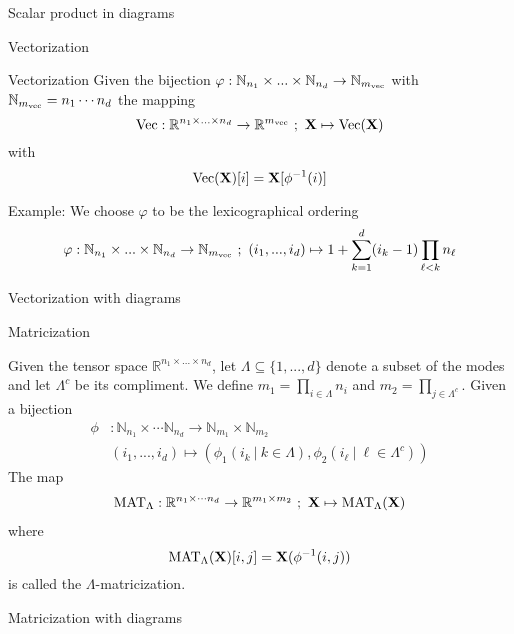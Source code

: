 \documentclass{beamer}
\newcommand{\bvec}[1]{\mathbf{#1}}
\newcommand{\vX}{\bvec{X}}
\begin{document}
\begin{frame}{Scalar product in diagrams}
    
\end{frame}


\begin{frame}{Vectorization}

\begin{definition}{Vectorization}
Given the bijection $\varphi : \mathbb{N}_{n_1} \times ... \times  \mathbb{N}_{n_d} \to  \mathbb{N}_{m_{\rm vec}}$ with $\mathbb{N}_{m_{\rm vec}} = n_1\cdots n_d$ the mapping 
$$
{\rm Vec} :  \mathbb{R}^{{n_1} \times ... \times  {n_d}} \to \mathbb{R}^{m_{\rm vec}}
~;~
\vX \mapsto {\rm Vec}(\vX)
$$
with 
$$
{\rm Vec}(\vX)[i]
=
\vX[\phi^{-1}(i)]
$$
\end{definition}

Example: We choose $\varphi$ to be the lexicographical ordering
$$
\varphi
:
\mathbb{N}_{n_1} \times ... \times  \mathbb{N}_{n_d} \to  \mathbb{N}_{m_{\rm vec}}
~;~
(i_1,...,i_d)
\mapsto
1 + \sum_{k=1}^d (i_k -1 ) \prod_{\ell < k} n_\ell
$$
    
\end{frame}

\begin{frame}{Vectorization with diagrams}
    
\end{frame}


\begin{frame}{Matricization}


\begin{definition}
Given the tensor space $ \mathbb{R}^{{n_1} \times ... \times  {n_d}}$, let $\Lambda \subseteq \{1,...,d\}$ denote a subset of the modes and let $\Lambda^c$ be its compliment.
We define $m_1=\prod_{i\in \Lambda } n_i$ and $m_2 =\prod_{j\in \Lambda^c}$. Given a bijection
\begin{equation*}
\begin{aligned}
\phi &: \mathbb{N}_{n_1} \times  \cdots \mathbb{N}_{n_d}
\to \mathbb{N}_{m_1} \times \mathbb{N}_{m_2}\\
&(i_1,...,i_d) \mapsto (\phi_1(i_k~|~k\in \Lambda), \phi_2(i_\ell~|~\ell \in \Lambda^c))  
\end{aligned}
\end{equation*}    
The map
\begin{equation*}
\begin{aligned}
{\rm MAT}_\Lambda 
: \mathbb{R}^{n_1\times \cdots n_d} \to \mathbb{R}^{m_1\times m_2}
~;~
\vX \mapsto {\rm MAT}_\Lambda (\vX)
\end{aligned}
\end{equation*}
where 
$$
{\rm MAT}_\Lambda (\vX)[i,j] 
=
\vX(\phi^{-1}(i,j)) 
$$
is called the $\Lambda$-matricization.

\end{definition}
    
\end{frame}

\begin{frame}{Matricization with diagrams}
    
\end{frame}
\end{document}
